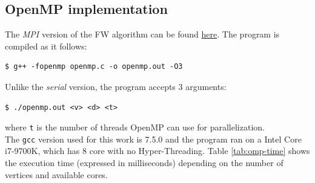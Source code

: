 \subsection{OpenMP implementation}
The \emph{MPI} version of the FW algorithm can be found \href{https://github.com/firaja/Parallel-FloydWarshall/blob/master/openmp.c}{here}. 
The program is compiled as it follows:
\begin{lstlisting}[basicstyle=\footnotesize\ttfamily]
$ g++ -fopenmp openmp.c -o openmp.out -O3
\end{lstlisting}
Unlike the \emph{serial} version, the program accepts 3 arguments:
\begin{lstlisting}[basicstyle=\footnotesize\ttfamily]
$ ./openmp.out <v> <d> <t>
\end{lstlisting}
where \texttt{t} is the number of threads OpenMP can use for parallelization. \\
The \texttt{gcc} version used for this work is 7.5.0 and the program ran on a Intel Core i7-9700K, which has 8 core with no Hyper-Threading.
Table \ref*{tab:omp-time} shows the execution time (expressed in milliseconds) depending on the number of vertices and available cores.

